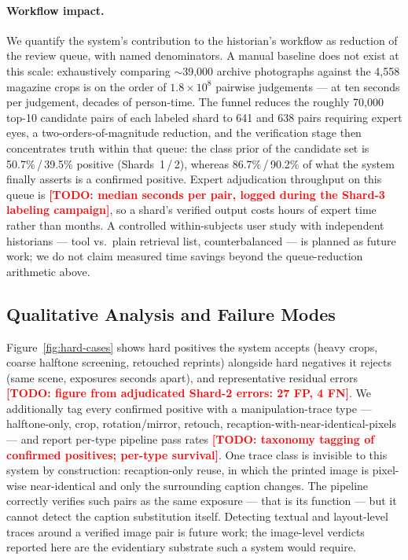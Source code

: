 \documentclass[letterpaper]{article} %
\newcommand{\todo}[1]{\textcolor{red}{\textbf{[TODO: #1]}}}
\begin{document}
\paragraph{Workflow impact.}
We quantify the system's contribution to the historian's workflow as
reduction of the review queue, with named denominators. A manual baseline
does not exist at this scale: exhaustively comparing $\sim$39{,}000
archive photographs against the 4{,}558 magazine crops is on the order of
$1.8\times10^{8}$ pairwise judgements --- at ten seconds per judgement,
decades of person-time. The funnel reduces the roughly 70{,}000 top-10
candidate pairs of each labeled shard to 641 and 638 pairs requiring
expert eyes, a two-orders-of-magnitude reduction, and the verification
stage then concentrates truth within that queue: the class prior of the
candidate set is 50.7\%\,/\,39.5\% positive (Shards~1\,/\,2), whereas
86.7\%\,/\,90.2\% of what the system finally asserts is a confirmed
positive. Expert adjudication throughput on this queue is
\todo{median seconds per pair, logged during the Shard-3 labeling
campaign}, so a shard's verified output costs hours of expert time
rather than months. A controlled within-subjects user study with
independent historians --- tool vs.\ plain retrieval list, counterbalanced
--- is planned as future work; we do not claim measured time savings
beyond the queue-reduction arithmetic above.

\subsection{Qualitative Analysis and Failure Modes}

Figure~\ref{fig:hard-cases} shows hard positives the system accepts
(heavy crops, coarse halftone screening, retouched reprints) alongside
hard negatives it rejects (same scene, exposures seconds apart), and
representative residual errors \todo{figure from adjudicated Shard-2
errors: 27 FP, 4 FN}. We additionally tag every confirmed positive with a
manipulation-trace type --- halftone-only, crop, rotation/mirror,
retouch, recaption-with-near-identical-pixels \cite{du2026evidence} ---
and report per-type pipeline pass rates \todo{taxonomy tagging of
confirmed positives; per-type survival}. One trace class is invisible to
this system by construction: recaption-only reuse, in which the printed
image is pixel-wise near-identical and only the surrounding caption
changes. The pipeline correctly verifies such pairs as the same exposure
--- that is its function --- but it cannot detect the caption
substitution itself. Detecting textual and layout-level traces around a
verified image pair is future work; the image-level verdicts reported
here are the evidentiary substrate such a system would require.
\end{document}
